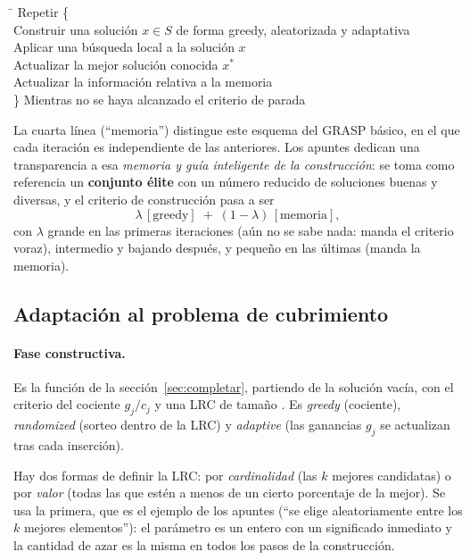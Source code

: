 \begin{apuntes}
\begin{tabbing}
\quad\=\kill
Repetir \{\\
\> Construir una solución $x\in S$ de forma greedy, aleatorizada y adaptativa\\
\> Aplicar una búsqueda local a la solución $x$\\
\> Actualizar la mejor solución conocida $x^\ast$\\
\> Actualizar la información relativa a la memoria\\
\} Mientras no se haya alcanzado el criterio de parada
\end{tabbing}
\end{apuntes}

La cuarta línea (``memoria'') distingue este esquema del GRASP básico, en el que cada
iteración es independiente de las anteriores. Los apuntes dedican una transparencia a esa
\emph{memoria y guía inteligente de la construcción}: se toma como referencia un
\textbf{conjunto élite} con un número reducido de soluciones buenas y diversas, y el criterio
de construcción pasa a ser
\[
   \lambda\,[\text{greedy}] \;+\; (1-\lambda)\,[\text{memoria}] ,
\]
con $\lambda$ grande en las primeras iteraciones (aún no se sabe nada: manda el criterio
voraz), intermedio y bajando después, y pequeño en las últimas (manda la memoria).

\subsection{Adaptación al problema de cubrimiento}

\paragraph{Fase constructiva.} Es la función  de la
sección~\ref{sec:completar}, partiendo de la solución vacía, con el criterio del cociente
$g_j/c_j$ y una LRC de tamaño . Es \emph{greedy} (cociente), \emph{randomized}
(sorteo dentro de la LRC) y \emph{adaptive} (las ganancias $g_j$ se actualizan tras cada
inserción).

\begin{decision}
Hay dos formas de definir la LRC: por \emph{cardinalidad} (las $k$ mejores candidatas) o por
\emph{valor} (todas las que estén a menos de un cierto porcentaje de la mejor). Se usa la
primera, que es el ejemplo de los apuntes (``se elige aleatoriamente entre los $k$ mejores
elementos''): el parámetro es un entero con un significado inmediato y la cantidad de azar es
la misma en todos los pasos de la construcción.
\end{decision}

